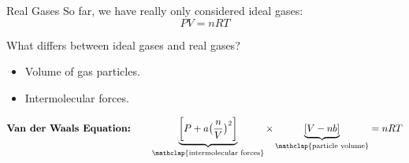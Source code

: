 \documentclass[handout]{beamer}
\begin{document}
\begin{frame}{Real Gases}
	So far, we have really only considered \alert{ideal} gases:
	\begin{equation*}
		PV = nRT
	\end{equation*}

	\pause

	What differs between ideal gases and real gases?
	\begin{itemize}[<+(1)->]
		\item Volume of gas particles.
		\item Intermolecular forces.
	\end{itemize}

	\pause

	\begin{equation*}
		\textbf{Van der Waals Equation:} \qquad \underbrace{\bigg[P +
		a\big(\frac{n}{V}\big)^2\bigg]}_{\mathclap{\text{intermolecular
		forces}}} \times \underbrace{[V-nb]}_{\mathclap{\text{particle
		volume}}} = nRT
	\end{equation*}
\end{frame}
\end{document}
